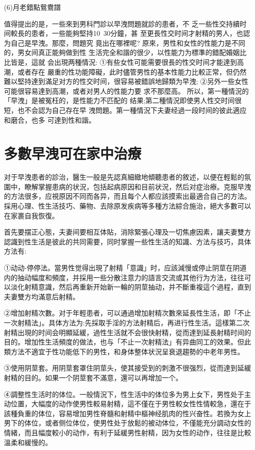 \documentclass[12pt,UTF8]{ctexbook}
\begin{document}
(6)月老錯點鴛鴦譜

值得提出的是，一些來到男科門診以早洩問題就診的患者，不
乏一些性交持續时间較長的患者，一些能夠堅持10~30分鐘，甚
至更長性交时间才射精的男人，也認为自己是早洩。那麼，問題究
竟出在哪裡呢?
原來，男性和女性的性能力是不同的，男女间真正能夠做到性
生活完全和諧的很少，以性能力为標準的錯配婚姻比比皆是，這就
会出現两種情況:
①有些女性可能需要很長的性交时间才能達到高潮，或者存在
嚴重的性功能障礙，此时儘管男性的基本性能力比較正常，但仍然
難以堅持達到滿足对方的性交时间，很容易被錯誤地歸類为早洩;
②另外一些女性可能很容易達到高潮，或者对男人的性能力要
求不那麼高。
所以，第一種情況的「早洩」是被冤枉的，是性能力不匹配的
结果;第二種情況即使男人性交时间很短，也不会認为自己存在早
洩問題。第一種情況下夫妻经過一段时间的彼此適应和磨合，也多
可達到性和諧。

\section{多數早洩可在家中治療}

对于早洩患者的診治，醫生一般是先認真細緻地傾聽患者的敘述，以便在輕鬆的氛圍中，瞭解掌握患病的状況，包括起病原因和目前状況，然后对症治療。克服早洩的方法很多，应視原因不同而各异，而且每个人都应該摸索出最適合自己的方法。採用心理、性生活技巧、藥物、去除原发疾病等多種方法綜合施治，絕大多數可以在家裹自我恢復。

首先要摆正心態，夫妻间要相互体貼，消除緊張心理及一切焦慮因素，讓夫妻雙方認識到性生活是彼此的共同需要，同时掌握一些性生活的知識、方法与技巧，具体方法有:

①动动-停停法。當男性觉得出現了射精「意識」时，应該減慢或停止阴莖在阴道内的抽动幅度和頻度，并採用一些分散注意力的語言交流或其他行为方法，往往可以淡化射精意識，然后再重新开始新一輪的阴莖抽动，并不斷重複這个過程，直到夫妻雙方均滿意后射精。

②增加射精次數。对于年輕患者，可以通過增加射精次數來延長性生活，即「不止一次射精法」。具体方法为:先採取手淫的方法射精后，再进行性生活。這樣第二次射精出現的时间会明顯延緩，過性生活就不会很快射精，從而達到延長射精时间的目的。增加性生活頻度的做法，也与「不止一次射精法」有异曲同工的效果。但此類方法不適宜于性功能低下的男性，和身体整体状況呈衰退趨勢的中老年男性。

③使用阴莖套。用阴莖套罩住阴莖头，使其接受到的刺激不很强烈，從而達到延緩射精的目的。如果一个阴莖套不滿意，還可以再增加一个。

④調整性生活时的体位。一般情況下，性生活中的体位多为男上女下，男性处于主动位置，大幅度的动作使男性較易射精，這不僅在于男性較女性性情較急，還在于該種負重的体位，容易增加男性脊髓和射精中樞神经肌肉的性兴奋性。若換为女上男下的体位，或者侧位体位，使男性处于放鬆的被动体位，不僅能充分調动女性的情緒，而且幅度較小的动作，有利于延緩男性射精，因为女性的动作，往往是比較溫柔和緩慢的。
\end{document}
